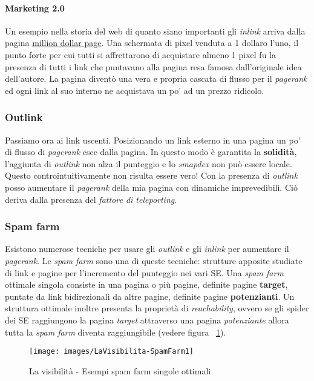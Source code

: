 				\paragraph{Marketing 2.0}
					Un esempio nella storia del web di quanto siano importanti gli \emph{inlink} arriva dalla pagina \href{http://www.milliondollarhomepage.com/}{million dollar page}. Una schermata di pixel venduta a 1 dollaro l'uno, il punto forte per cui tutti si affrettarono di acquistare almeno 1 pixel fu la presenza di tutti i link che puntavano alla pagina resa famosa dall'originale idea dell'autore. La pagina diventò una vera e propria cascata di flusso per il \emph{pagerank} ed ogni link al suo interno ne acquistava un po' ad un prezzo ridicolo.
			
			\subsubsection{Outlink}
				Passiamo ora ai link uscenti. Posizionando un link esterno in una pagina un po' di flusso di \emph{pagerank} esce dalla pagina. In questo modo è garantita la \textbf{solidità}, l'aggiunta di \emph{outlink} non alza il punteggio e lo \emph{smapdex} non può essere locale.
				Questo controintuitivamente non risulta essere vero! Con la presenza di \emph{outlink} posso aumentare il \emph{pagerank} della mia pagina con dinamiche imprevedibili. Ciò deriva dalla presenza del \emph{fattore di teleporting}.
			
			\subsubsection{Spam farm}
				Esistono numerose tecniche per usare gli \emph{outlink} e gli \emph{inlink} per aumentare il \emph{pagerank}. Le \emph{spam farm} sono una di queste tecniche: strutture apposite studiate di link e pagine per l'incremento del punteggio nei vari SE. 
				Una \emph{spam farm} ottimale singola consiste in una pagina o più pagine, definite pagine \textbf{target}, puntate da link bidirezionali da altre pagine, definite pagine \textbf{potenzianti}. Un struttura ottimale inoltre presenta la proprietà di \emph{reachability}, ovvero se gli spider dei SE raggiungono la pagina \emph{target} attraverso una pagina \emph{potenziante} allora tutta la \emph{spam farm} diventa raggiungibile (vedere figura ~\ref{fig:LaVisibilita-SpamFarm1}).
				
				\begin{figure} [h]
					\centering
					\texttt{[image: images/LaVisibilita-SpamFarm1]}
					\caption{La visibilità - Esempi spam farm singole ottimali}
					\label{fig:LaVisibilita-SpamFarm1}
				\end{figure}
				
